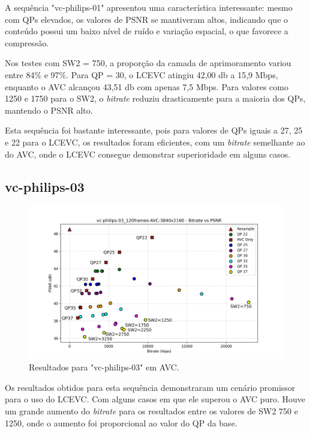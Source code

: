 A sequência "vc-philips-01" apresentou uma característica interessante: mesmo
com QPs elevados, os valores de \acrshort{PSNR} se mantiveram altos, indicando
que o conteúdo possui um baixo nível de ruído e variação espacial, o que
favorece a compressão.

Nos testes com SW2 = 750, a proporção da camada de aprimoramento variou entre
84\% e 97\%. Para QP = 30, o \acrshort{LCEVC} atingiu 42,00 db a 15,9 Mbps,
enquanto o \acrshort{AVC} alcançou 43,51 db com apenas 7,5 Mbps. Para valores 
como 1250 e 1750 para o SW2, o \textit{bitrate} reduziu drasticamente
para a maioria dos QPs, mantendo o \acrshort{PSNR} alto.

Esta sequência foi bastante interessante, pois para valores de QPs iguais
a 27, 25 e 22 para o \acrshort{LCEVC}, os resultados foram eficientes,
com um \textit{bitrate} semelhante ao do \acrshort{AVC}, onde o \acrshort{LCEVC}
consegue demonstrar superioridade em alguns casos. 

\newpage

\subsection{vc-philips-03}

\begin{figure}[h]
    \centering
    \includegraphics[width=1.0\textwidth]{img/vc-philips-03_120frames-AVC.png}
    \caption{Resultados para "vc-philips-03" em \acrshort{AVC}.}
    \label{fig:vc-philips-03}
\end{figure}

Os resultados obtidos para esta sequência demonstraram um cenário promissor para
o uso do \acrshort{LCEVC}. Com alguns casos em que ele superou o \acrshort{AVC} puro.
Houve um grande aumento do \textit{bitrate} para os resultados entre os valores de SW2
750 e 1250, onde o aumento foi proporcional ao valor do QP da base.

